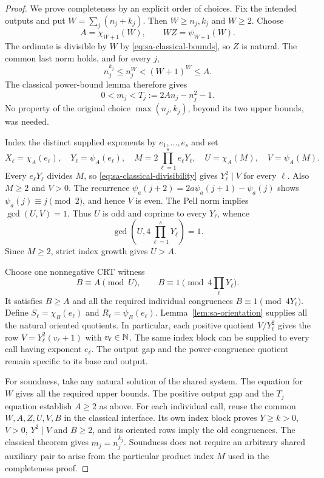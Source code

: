 \begin{proof}
We prove completeness by an explicit order of choices.  Fix the intended
outputs and put $W=\sum_j(n_j+k_j)$.  Then $W\geq n_j,k_j$ and
$W\geq2$.  Choose
\[
 A=\chi_{W+1}(W),\qquad WZ=\psi_{W+1}(W).
\]
The ordinate is divisible by $W$ by
\eqref{eq:sa-classical-bounds}, so $Z$ is natural.  The common last
norm holds, and for every $j$,
\[
 n_j^{k_j}\leq n_j^W<(W+1)^W\leq A.
\]
The classical power-bound lemma therefore gives
\[
 0<m_j<T_j:=2An_j-n_j^2-1.
\]
No property of the original choice $\max(n_j,k_j)$, beyond its two
upper bounds, was needed.

Index the distinct supplied exponents by $e_1,\ldots,e_s$ and set
\[
 X_\ell=\chi_A(e_\ell),\quad Y_\ell=\psi_A(e_\ell),\quad
 M=2\prod_{\ell=1}^s e_\ell Y_\ell,
 \quad U=\chi_A(M),\quad V=\psi_A(M).
\]
Every $e_\ell Y_\ell$ divides $M$, so
\eqref{eq:sa-classical-divisibility} gives $Y_\ell^2\mid V$ for
every $\ell$.  Also $M\geq2$ and $V>0$.
The recurrence $\psi_a(j+2)=2a\psi_a(j+1)-\psi_a(j)$ shows
$\psi_a(j)\equiv j\pmod2$, and hence $V$ is even.
The Pell norm implies $\gcd(U,V)=1$.  Thus $U$ is odd and coprime
to every $Y_\ell$, whence
\[
 \gcd\left(U,4\prod_{\ell=1}^sY_\ell\right)=1.
\]
Since $M\geq2$, strict index growth gives $U>A$.

Choose one nonnegative CRT witness
\[
 B\equiv A\pmod U,
 \qquad B\equiv1\pmod{4\prod_\ell Y_\ell}.
\]
It satisfies $B\geq A$ and all the required individual congruences
$B\equiv1\pmod{4Y_\ell}$.  Define
$S_\ell=\chi_B(e_\ell)$ and $R_\ell=\psi_B(e_\ell)$.
Lemma~\ref{lem:sa-orientation} supplies all the natural oriented
quotients.  In particular, each positive quotient $V/Y_\ell^2$ gives
the row $V=Y_\ell^2(v_\ell+1)$ with $v_\ell\in\mathbb N$.
The same index block can be supplied to every call having exponent
$e_\ell$.  The output gap and the power-congruence quotient remain
specific to its base and output.

For soundness, take any natural solution of the shared system.
The equation for $W$ gives all the required upper bounds.  The positive
output gap and the $T_j$ equation establish $A\geq2$ as above.
For each individual call, reuse the common $W,A,Z,U,V,B$ in the
classical interface.  Its own index block proves $Y\geq k>0$,
$V>0$, $Y^2\mid V$ and $B\geq2$, and its oriented rows imply the
old congruences.  The classical theorem gives $m_j=n_j^{k_j}$.
Soundness does not require an arbitrary shared auxiliary pair to arise
from the particular product index $M$ used in the completeness proof.
\end{proof}

